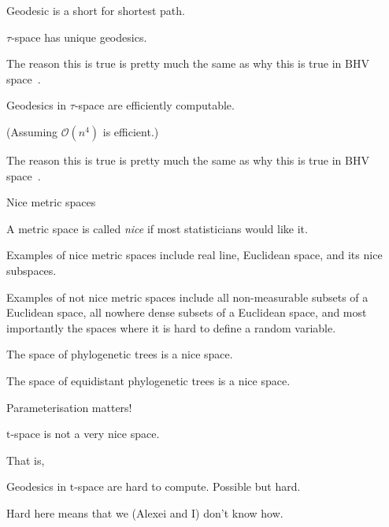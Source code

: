 \documentclass{beamer}
\renewcommand{\t}{$\mathrm{t}$}
\newcommand{\BHV}{$\mathrm{BHV}$}
\begin{document}
\begin{frame}
Geodesic is a short for shortest path. 

\begin{theorem}
$\tau$-space has unique geodesics.
\end{theorem}

The reason this is true is pretty much the same as why this is true in \BHV space~\cite{bhv}. 

\begin{theorem}
Geodesics in $\tau$-space are efficiently computable. 
\end{theorem}

(Assuming $\mathcal O(n^4)$ is efficient.)

The reason this is true is pretty much the same as why this is true in \BHV space~\cite{owen2011fast}. 
\end{frame}

\begin{frame}{Nice metric spaces}
\begin{definition}
A metric space is called {\em nice} if most statisticians would like it. 
\end{definition}

Examples of nice metric spaces include real line, Euclidean space, and its nice subspaces. 

Examples of not nice metric spaces include all non-measurable subsets of a Euclidean space, all nowhere dense subsets of a Euclidean space, and most importantly the spaces where it is hard to define a random variable. 

\begin{theorem}
The space of phylogenetic trees is a nice space. 
\end{theorem}

\begin{theorem}
The space of equidistant phylogenetic trees is a nice space. 
\end{theorem}
\end{frame}

\begin{frame}{Parameterisation matters!}
\begin{theorem}
\t-space is not a very nice space. 
\end{theorem}

That is,

\begin{theorem}
Geodesics in \t-space are hard to compute. Possible but hard. 
\end{theorem}

Hard here means that we (Alexei and I) don't know how. 
\end{frame}
\end{document}
